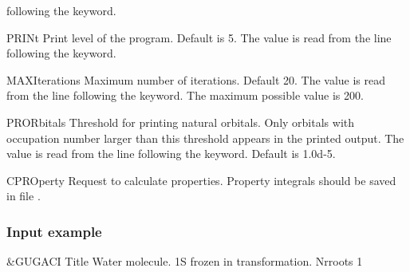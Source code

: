 \begin{keywordlist}
following the keyword.
\item[PRINt]
Print level of the program. Default is 5. The value is read from the
line following the keyword.
\item[MAXIterations]
Maximum number of iterations. Default 20. The
value is read from the line following the keyword.
The maximum possible value is 200.
\item[PRORbitals]
Threshold for printing natural orbitals. Only orbitals with occupation
number larger than this threshold appears in the printed output. The
value is read from the line following the keyword.
Default is 1.0d-{}5.
\item[CPROperty]
Request to calculate properties. Property integrals should be saved in file .
\end{keywordlist}

\subsubsection{Input example}

\begin{inputlisting}
 &GUGACI
Title
 Water molecule. 1S frozen in transformation.
Nrroots
 1
\end{inputlisting}



